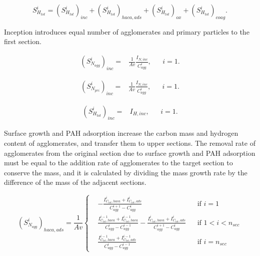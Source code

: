 \begin{equation}
	S^i_{H_{tot}} = 
	\left(S^i_{H_{tot}}\right)_{inc}
	+\left(S^i_{H_{tot}}\right)_{haca, ads}
	+\left(S^i_{H_{tot}}\right)_{ox}
	+\left(S^i_{H_{tot}}\right)_{coag}
	\label{eqn:S_Htotsect}.
\end{equation}

Inception introduces equal number of agglomerates and primary particles to the first section.

\begin{equation}
	\begin{aligned}
		\left(S^i_{N_{agg}}\right)_{inc} =
		&\frac{1}{Av}\frac{I_{N, inc}}{C^i_{agg}}, && i=1.
	\end{aligned}
	\label{eqn:S_Nagg_incsect}
\end{equation}

\begin{equation}
	\begin{aligned}
		\left(S^i_{N_{pri}}\right)_{inc} =
		&\frac{1}{Av}\frac{I_{N, inc}}{C^i_{agg}}, && i=1.
	\end{aligned}
	\label{eqn:S_Npri_incsect}
\end{equation}

\begin{equation}
	\begin{aligned}
		\left(S^i_{H_{tot}}\right)_{inc} =
		&I_{H, inc}, && i=1.
	\end{aligned}
	\label{eqn:S_Htot_incsect}
\end{equation}

Surface growth and PAH adsorption increase the carbon mass and hydrogen content of agglomerates, and transfer them to upper sections. The removal rate of agglomerates from the original section due to surface growth and PAH adsorption must be equal to the addition rate of agglomerates to the target section to conserve the mass, and it is calculated by dividing the mass growth rate by the difference of the mass of the adjacent sections.

\begin{equation}
	\left(S^i_{N_{agg}}\right)_{haca, ads}=
	\frac{1}{Av}
	\left\{
	\begin{aligned}
		&-\frac{I^i_{C_{tot},haca}+I^i_{C_{tot},ads}}{C^{i+1}_{agg}-C^{i}_{agg}}
		&&
		\text{if } i = 1
		\\
		&\frac{I^{i-1}_{C_{tot},haca}+I^{i-1}_{C_{tot},haca}}{C^{i}_{agg}-C^{i-1}_{agg}}
		-\frac{I^{i}_{C_{tot},haca}+I^{i}_{C_{tot},ads}}{C^{i+1}_{agg}-C^{i}_{agg}}
		&&
		\text{if } 1 < i < n_{sec}
		\\
		&\frac{I^{i-1}_{C_{tot},haca}+I^{i-1}_{C_{tot},ads}}{C^{i}_{agg}-C^{i-1}_{agg}}
		&&\text{if } i=n_{sec}
	\end{aligned}
	\right.
	\label{eqn:S_Nagg_gradssect}
\end{equation}

